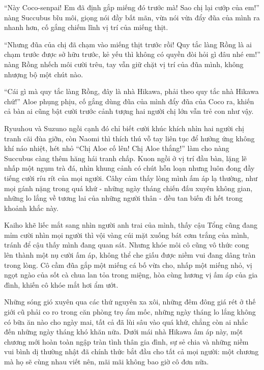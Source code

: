 \documentclass[../main.tex]{subfiles}
\begin{document}
``Này Coco-senpai! Em đã định gắp miếng đó trước mà! Sao chị lại cướp của em!'' nàng Succubus bĩu môi, giọng nói đầy bất mãn, vừa nói vừa đẩy đũa của mình ra nhanh hơn, cố gắng chiếm lĩnh vị trí của miếng thịt. 

``Nhưng đũa của chị đã chạm vào miếng thịt trước rồi! Quy tắc làng Rồng là ai chạm trước được sở hữu trước, kẻ yếu thì không có quyền đòi hỏi gì đâu nhé em!'' nàng Rồng nhếch môi cười trêu, tay vẫn giữ chặt vị trí của đũa mình, không nhượng bộ một chút nào.

``Cái gì mà quy tắc làng Rồng, đây là nhà Hikawa, phải theo quy tắc nhà Hikawa chứ!'' Aloe phụng phịu, cố gắng dùng đũa của mình đẩy đũa của Coco ra, khiến cả bàn ai cũng bật cười trước cảnh tượng hai người chị lớn vẫn trẻ con như vậy.

Ryuuhou và Suzuno ngồi cạnh đó chỉ biết cười khúc khích nhìn hai người chị tranh cãi đùa giỡn, còn Naomi thì thích thú vỗ tay liên tục để hưởng ứng không khí náo nhiệt, hét nhỏ ``Chị Aloe cố lên! Chị Aloe thắng!'' làm cho nàng Succubus càng thêm hăng hái tranh chấp. Kuon ngồi ở vị trí đầu bàn, lặng lẽ nhấp một ngụm trà đá, nhìn khung cảnh có chút hỗn loạn nhưng luôn đong đầy tiếng cười ríu rít của mọi người. Câhy cảm thấy lòng mình ấm áp lạ thường, như mọi gánh nặng trong quá khứ - những ngày tháng chiến đấu xuyên không gian, những lo lắng về tương lai của những người thân - đều tan biến đi hết trong khoảnh khắc này.

Kaiho khẽ liếc mắt sang nhìn người anh trai của mình, thấy cậu Tổng cũng đang mỉm cười nhìn mọi người thì vội vàng cúi mặt xuống bát cơm trắng của mình, tránh để cậu thấy mình đang quan sát. Nhưng khóe môi cô cũng vô thức cong lên thành một nụ cười ấm áp, không thể che giấu được niềm vui đang dâng tràn trong lòng. Cô cầm đũa gắp một miếng cá bố vừa cho, nhấp một miếng nhỏ, vị ngọt ngào của sốt cà chua lan tỏa trong miệng, hòa cùng hương vị ấm áp của gia đình, khiến cô khóe mắt hơi ẩm ướt.

Những sóng gió xuyên qua các thứ nguyên xa xôi, những đêm đông giá rét ở thế giới cũ phải co ro trong căn phòng trọ ẩm mốc, những ngày tháng lo lắng không có bữa ăn nào cho ngày mai, tất cả đã lùi sâu vào quá khứ, chẳng còn ai nhắc đến những ngày tháng khó khăn nữa. Dưới mái nhà Hikawa ấm áp này, một chương mới hoàn toàn ngập tràn tình thân gia đình, sự sẻ chia và những niềm vui bình dị thường nhật đã chính thức bắt đầu cho tất cả mọi người: một chương mà họ sẽ cùng nhau viết nên, mãi mãi không bao giờ cô đơn nữa.
\end{document}
